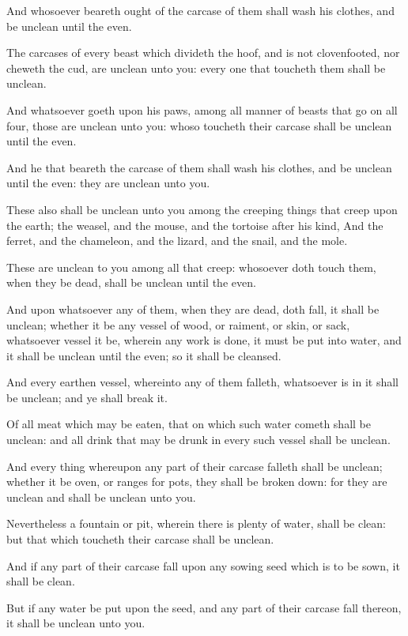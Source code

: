 \Verse And whosoever beareth ought of the carcase of them shall wash his clothes, and be unclean until the even.

\Verse The carcases of every beast which divideth the hoof, and is not clovenfooted, nor cheweth the cud, are unclean unto you: every one that toucheth them shall be unclean.

\Verse And whatsoever goeth upon his paws, among all manner of beasts that go on all four, those are unclean unto you: whoso toucheth their carcase shall be unclean until the even.

\Verse And he that beareth the carcase of them shall wash his clothes, and be unclean until the even: they are unclean unto you.

\Verse These also shall be unclean unto you among the creeping things that creep upon the earth; the weasel, and the mouse, and the tortoise after his kind, \Verse And the ferret, and the chameleon, and the lizard, and the snail, and the mole.

\Verse These are unclean to you among all that creep: whosoever doth touch them, when they be dead, shall be unclean until the even.

\Verse And upon whatsoever any of them, when they are dead, doth fall, it shall be unclean; whether it be any vessel of wood, or raiment, or skin, or sack, whatsoever vessel it be, wherein any work is done, it must be put into water, and it shall be unclean until the even; so it shall be cleansed.

\Verse And every earthen vessel, whereinto any of them falleth, whatsoever is in it shall be unclean; and ye shall break it.

\Verse Of all meat which may be eaten, that on which such water cometh shall be unclean: and all drink that may be drunk in every such vessel shall be unclean.

\Verse And every thing whereupon any part of their carcase falleth shall be unclean; whether it be oven, or ranges for pots, they shall be broken down: for they are unclean and shall be unclean unto you.

\Verse Nevertheless a fountain or pit, wherein there is plenty of water, shall be clean: but that which toucheth their carcase shall be unclean.

\Verse And if any part of their carcase fall upon any sowing seed which is to be sown, it shall be clean.

\Verse But if any water be put upon the seed, and any part of their carcase fall thereon, it shall be unclean unto you.

